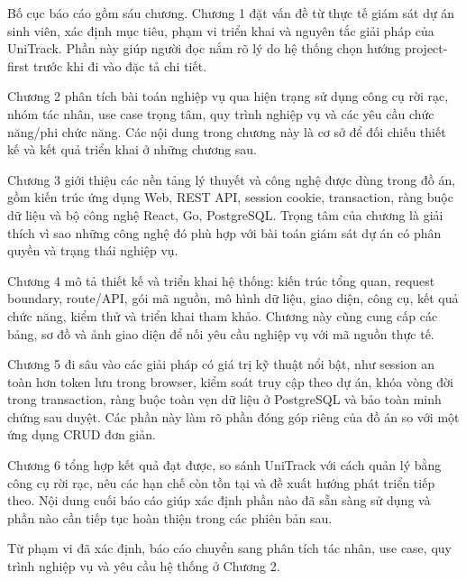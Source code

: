 Bố cục báo cáo gồm sáu chương. Chương 1 đặt vấn đề từ thực tế giám sát dự án sinh viên, xác định mục tiêu, phạm vi triển khai và nguyên tắc giải pháp của UniTrack. Phần này giúp người đọc nắm rõ lý do hệ thống chọn hướng project-first trước khi đi vào đặc tả chi tiết.

Chương 2 phân tích bài toán nghiệp vụ qua hiện trạng sử dụng công cụ rời rạc, nhóm tác nhân, use case trọng tâm, quy trình nghiệp vụ và các yêu cầu chức năng/phi chức năng. Các nội dung trong chương này là cơ sở để đối chiếu thiết kế và kết quả triển khai ở những chương sau.

Chương 3 giới thiệu các nền tảng lý thuyết và công nghệ được dùng trong đồ án, gồm kiến trúc ứng dụng Web, REST API, session cookie, transaction, ràng buộc dữ liệu và bộ công nghệ React, Go, PostgreSQL. Trọng tâm của chương là giải thích vì sao những công nghệ đó phù hợp với bài toán giám sát dự án có phân quyền và trạng thái nghiệp vụ.

Chương 4 mô tả thiết kế và triển khai hệ thống: kiến trúc tổng quan, request boundary, route/API, gói mã nguồn, mô hình dữ liệu, giao diện, công cụ, kết quả chức năng, kiểm thử và triển khai tham khảo. Chương này cũng cung cấp các bảng, sơ đồ và ảnh giao diện để nối yêu cầu nghiệp vụ với mã nguồn thực tế.

Chương 5 đi sâu vào các giải pháp có giá trị kỹ thuật nổi bật, như session an toàn hơn token lưu trong browser, kiểm soát truy cập theo dự án, khóa vòng đời trong transaction, ràng buộc toàn vẹn dữ liệu ở PostgreSQL và bảo toàn minh chứng sau duyệt. Các phần này làm rõ phần đóng góp riêng của đồ án so với một ứng dụng CRUD đơn giản.

Chương 6 tổng hợp kết quả đạt được, so sánh UniTrack với cách quản lý bằng công cụ rời rạc, nêu các hạn chế còn tồn tại và đề xuất hướng phát triển tiếp theo. Nội dung cuối báo cáo giúp xác định phần nào đã sẵn sàng sử dụng và phần nào cần tiếp tục hoàn thiện trong các phiên bản sau.

Từ phạm vi đã xác định, báo cáo chuyển sang phân tích tác nhân, use case, quy trình nghiệp vụ và yêu cầu hệ thống ở Chương 2.
